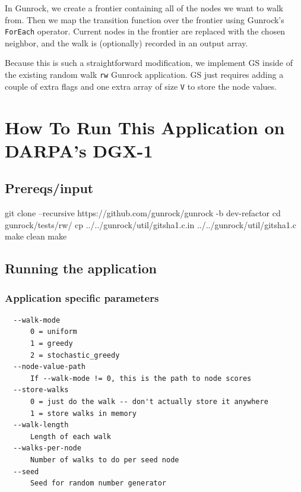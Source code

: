 \documentclass[10pt,oneside]{memoir}
\newenvironment{Shaded}{}{}
\newcommand{\BuiltInTok}[1]{#1}
\newcommand{\FunctionTok}[1]{\textcolor[rgb]{0.02,0.16,0.49}{#1}}
\newcommand{\NormalTok}[1]{#1}
\begin{document}
In Gunrock, we create a frontier containing all of the nodes we want to
walk from. Then we map the transition function over the frontier using
Gunrock's \texttt{ForEach} operator. Current nodes in the frontier are
replaced with the chosen neighbor, and the walk is (optionally) recorded
in an output array.

Because this is such a straightforward modification, we implement GS
inside of the existing random walk \texttt{rw} Gunrock application. GS
just requires adding a couple of extra flags and one extra array of size
\texttt{\textbar{}V\textbar{}} to store the node values.

\hypertarget{how-to-run-this-application-on-darpas-dgx-1-3}{%
\section{How To Run This Application on DARPA's
DGX-1}\label{how-to-run-this-application-on-darpas-dgx-1-3}}

\hypertarget{prereqsinput-2}{%
\subsection{Prereqs/input}\label{prereqsinput-2}}

\begin{Shaded}
\begin{Highlighting}[]
\FunctionTok{git}\NormalTok{ clone --recursive https://github.com/gunrock/gunrock -b dev-refactor}
\BuiltInTok{cd}\NormalTok{ gunrock/tests/rw/}
\FunctionTok{cp}\NormalTok{ ../../gunrock/util/gitsha1.c.in ../../gunrock/util/gitsha1.c}
\FunctionTok{make}\NormalTok{ clean}
\FunctionTok{make}
\end{Highlighting}
\end{Shaded}

\hypertarget{running-the-application-3}{%
\subsection{Running the application}\label{running-the-application-3}}

\hypertarget{application-specific-parameters-1}{%
\subsubsection{Application specific
parameters}\label{application-specific-parameters-1}}

\begin{verbatim}
  --walk-mode
      0 = uniform
      1 = greedy
      2 = stochastic_greedy
  --node-value-path
      If --walk-mode != 0, this is the path to node scores
  --store-walks
      0 = just do the walk -- don't actually store it anywhere
      1 = store walks in memory
  --walk-length
      Length of each walk
  --walks-per-node
      Number of walks to do per seed node
  --seed
      Seed for random number generator
\end{verbatim}
\end{document}
